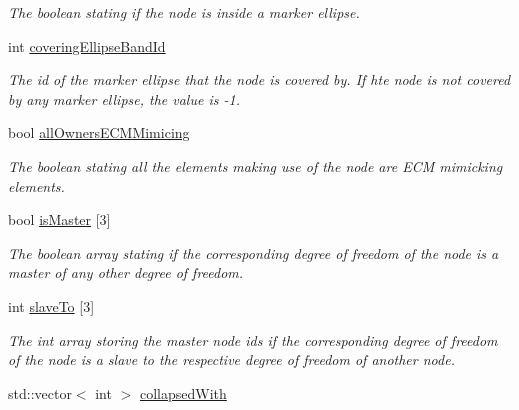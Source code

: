 \begin{DoxyCompactItemize}
\begin{DoxyCompactList}\small\item\em The boolean stating if the node is inside a marker ellipse. \end{DoxyCompactList}\item 
\hypertarget{classNode_a5a0c478d6925dc16abf3995061fda191}{}int \hyperlink{classNode_a5a0c478d6925dc16abf3995061fda191}{covering\+Ellipse\+Band\+Id}\label{classNode_a5a0c478d6925dc16abf3995061fda191}

\begin{DoxyCompactList}\small\item\em The id of the marker ellipse that the node is covered by. If hte node is not covered by any marker ellipse, the value is -\/1. \end{DoxyCompactList}\item 
\hypertarget{classNode_aa9eb82543b868adc05b5543251ebb42f}{}bool \hyperlink{classNode_aa9eb82543b868adc05b5543251ebb42f}{all\+Owners\+E\+C\+M\+Mimicing}\label{classNode_aa9eb82543b868adc05b5543251ebb42f}

\begin{DoxyCompactList}\small\item\em The boolean stating all the elements making use of the node are E\+C\+M mimicking elements. \end{DoxyCompactList}\item 
\hypertarget{classNode_af96140b8fa2e7abffd79a040c6972309}{}bool \hyperlink{classNode_af96140b8fa2e7abffd79a040c6972309}{is\+Master} \mbox{[}3\mbox{]}\label{classNode_af96140b8fa2e7abffd79a040c6972309}

\begin{DoxyCompactList}\small\item\em The boolean array stating if the corresponding degree of freedom of the node is a master of any other degree of freedom. \end{DoxyCompactList}\item 
\hypertarget{classNode_a83aeb69143ee2ddc1f6f49be4b261b44}{}int \hyperlink{classNode_a83aeb69143ee2ddc1f6f49be4b261b44}{slave\+To} \mbox{[}3\mbox{]}\label{classNode_a83aeb69143ee2ddc1f6f49be4b261b44}

\begin{DoxyCompactList}\small\item\em The int array storing the master node ids if the corresponding degree of freedom of the node is a slave to the respective degree of freedom of another node. \end{DoxyCompactList}\item 
\hypertarget{classNode_a099baa33319712e8ff03063385f8e095}{}std\+::vector$<$ int $>$ \hyperlink{classNode_a099baa33319712e8ff03063385f8e095}{collapsed\+With}\label{classNode_a099baa33319712e8ff03063385f8e095}


\end{DoxyCompactItemize}
